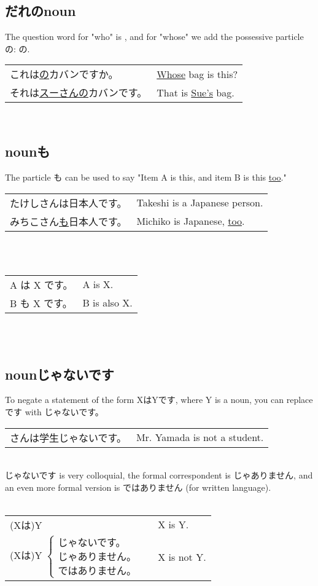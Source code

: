 \documentclass{article}
\newenvironment{grules}
{
	\,\\\-\quad 
	\renewcommand{\arraystretch}{1.5}
	\begin{tabular}{|ll|}
		\hline
}
{
		\\ 
		\hline
	\end{tabular}
	\renewcommand{\arraystretch}{1}
	\\\\
}
\newenvironment{gex}
{
	\,\\
	\renewcommand{\arraystretch}{1.5}
    \begin{tabular}{m{20em} l}
}
{
	\end{tabular}
	\renewcommand{\arraystretch}{1}
	\\
}
\begin{document}
   
   \subsection{だれのnoun}
   The question word for "who" is , and for "whose" we add the possessive particle の: の.
   \begin{gex}
   これは\underline{\ruby{誰}{だれ}の}カバンですか。 & \underline{Whose} bag is this? \\
   それは\underline{スーさんの}カバンです。 & That is \underline{Sue's} bag.
   \end{gex}
   
   
   \subsection{nounも}
   The particle も can be used to say "Item A is this, and item B is this \underline{too}."
   \begin{gex}
   たけしさんは日本人です。 & Takeshi is a Japanese person. \\
   みちこさん\underline{も}日本人です。 & Michiko is Japanese, \underline{too}.
   \end{gex}   
   \begin{grules}
   A は X です。 & A is X. \\
   B も X です。 & B is also X.
   \end{grules}
      
   
   
   \subsection{nounじゃないです}
   To negate a statement of the form XはYです, where Y is a noun, you can replace です with じゃないです。 
   \begin{gex}
   \ruby{山田}{やまだ}さんは学生じゃないです。 & Mr. Yamada is not a student.
   \end{gex}  
   じゃないです is very colloquial, the formal correspondent is じゃありません, and an even more formal version is ではありません (for written language). \\
   \begin{grules}
   (Xは)Y & X is Y. \\   
   (Xは)Y
   $\begin{cases}
   \text{じゃないです。}&\\
   \text{じゃありません。}& \\
   \text{ではありません。}&
   \end{cases}$
   & X is not Y.
   \end{grules}
   
\end{document}
